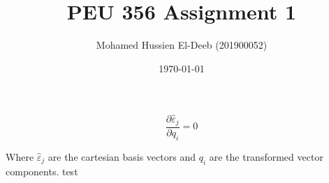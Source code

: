 \documentclass[12pt]{article}
\title{PEU 356 Assignment 1}
\author{Mohamed Hussien El-Deeb (201900052)}
\date{\today}
\begin{document}
\maketitle

\[
    \frac{\partial \widehat{\varepsilon}_j}{\partial q_i} = 0
\]

Where \(\widehat{\varepsilon}_j\)
are the cartesian basis vectors and \(q_i\)
are the transformed vector components.
test
\end{document}

